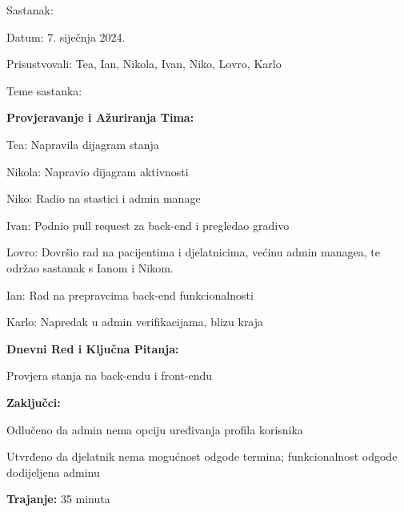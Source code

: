\begin{packed_enum}
    \item Sastanak:
    \item[] \begin{packed_item}
        \item Datum: 7. siječnja 2024.
        \item Prisustvovali: Tea, Ian, Nikola, Ivan, Niko, Lovro, Karlo
        \item Teme sastanka:
            \begin{packed_item}
                \item \textbf{Provjeravanje i Ažuriranja Tima:}
                    \begin{packed_item}
                        \item Tea: Napravila dijagram stanja
                        \item Nikola: Napravio dijagram aktivnosti 
                        \item Niko: Radio na stastici i admin manage 
                        \item Ivan: Podnio pull request za back-end i pregledao gradivo
                        \item Lovro: Dovršio rad na pacijentima i djelatnicima, većinu admin managea, te održao sastanak s Ianom i Nikom.
                        \item Ian: Rad na prepravcima back-end funkcionalnosti
                        \item Karlo: Napredak u admin verifikacijama, blizu kraja
                    \end{packed_item}
                \item \textbf{Dnevni Red i Ključna Pitanja:}
                    \begin{packed_item}
                        \item Provjera stanja na back-endu i front-endu
                    \end{packed_item}
                \item \textbf{Zaključci:}
                    \begin{packed_item}
                        \item Odlučeno da admin nema opciju uređivanja profila korisnika
                        \item Utvrđeno da djelatnik nema mogućnost odgode termina; funkcionalnost odgode dodijeljena adminu
                    \end{packed_item}
                \item \textbf{Trajanje:} 35 minuta
            \end{packed_item}
    \end{packed_item}

		\end{packed_enum}
		
